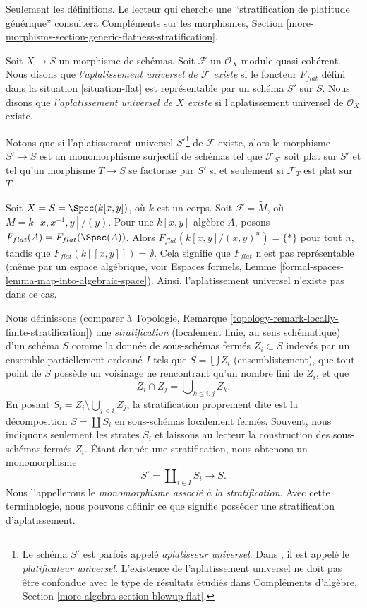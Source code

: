 \noindent
Seulement les définitions. Le lecteur qui cherche une
``stratification de platitude générique'' consultera
Compléments sur les morphismes, Section
\ref{more-morphisms-section-generic-flatness-stratification}.

\begin{definition}
\label{definition-flattening}
Soit $X \to S$ un morphisme de schémas.
Soit $\mathcal{F}$ un $\mathcal{O}_X$-module quasi-cohérent.
Nous disons que {\it l'aplatissement universel de $\mathcal{F}$ existe}
si le foncteur $F_{flat}$ défini dans la situation \ref{situation-flat}
est représentable par un schéma $S'$ sur $S$.
Nous disons que {\it l'aplatissement universel de $X$ existe}
si l'aplatissement universel de $\mathcal{O}_X$ existe.
\end{definition}

\noindent
Notons que si l'aplatissement universel $S'$\footnote{Le schéma $S'$ est parfois
appelé {\it aplatisseur universel}. Dans \cite{GruRay}, il est appelé
le {\it platificateur universel}. L'existence de l'aplatissement universel
ne doit pas être confondue avec le type de résultats étudiés dans
Compléments d'algèbre, Section \ref{more-algebra-section-blowup-flat}.} de
$\mathcal{F}$ existe, alors le morphisme $S' \to S$ est un monomorphisme
surjectif de schémas tel que $\mathcal{F}_{S'}$ soit plat sur $S'$
et tel qu'un morphisme $T \to S$ se factorise par $S'$ si et seulement si
$\mathcal{F}_T$ est plat sur $T$.

\begin{example}
\label{example-no-universal-flattening}
Soit $X = S = \Spec(k[x, y])$, où $k$ est un corps. Soit
$\mathcal{F} = \widetilde{M}$, où $M = k[x, x^{-1}, y]/(y)$.
Pour une $k[x, y]$-algèbre $A$, posons $F_{flat}(A) = F_{flat}(\Spec(A))$.
Alors $F_{flat}(k[x, y]/(x, y)^n) = \{*\}$ pour tout $n$, tandis que
$F_{flat}(k[[x, y]]) = \emptyset$. Cela signifie que $F_{flat}$ n'est pas
représentable (même par un espace algébrique, voir
Espaces formels, Lemme
\ref{formal-spaces-lemma-map-into-algebraic-space}).
Ainsi, l'aplatissement universel n'existe pas dans ce cas.
\end{example}

\noindent
Nous définissons (comparer à
Topologie, Remarque \ref{topology-remark-locally-finite-stratification})
une {\it stratification} (localement finie, au sens schématique) d'un schéma $S$
comme la donnée de sous-schémas fermés $Z_i \subset S$ indexés par un
ensemble partiellement ordonné $I$ tels que
$S = \bigcup Z_i$ (ensemblistement), que tout point de $S$ possède
un voisinage ne rencontrant qu'un nombre fini de $Z_i$, et que
$$
Z_i \cap Z_j = \bigcup\nolimits_{k \leq i, j} Z_k.
$$
En posant $S_i = Z_i \setminus \bigcup_{j < i} Z_j$, la stratification
proprement dite est la décomposition $S = \coprod S_i$ en
sous-schémas localement fermés. Souvent, nous indiquons seulement les strates
$S_i$ et laissons au lecteur la construction des sous-schémas fermés $Z_i$.
Étant donnée une stratification, nous obtenons un monomorphisme
$$
S' = \coprod\nolimits_{i \in I} S_i \longrightarrow S.
$$
Nous l'appellerons le {\it monomorphisme associé à la stratification}.
Avec cette terminologie, nous pouvons définir ce que signifie posséder une
stratification d'aplatissement.

